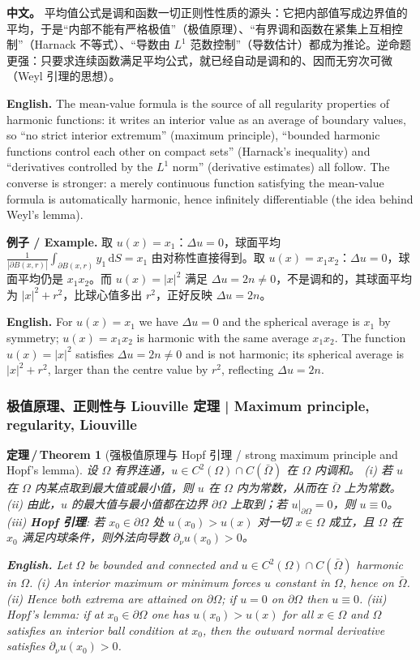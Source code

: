 \documentclass[UTF8,11pt,a4paper]{ctexart}
\newcommand{\APS}[2]{\par\noindent\textbf{中文。} #1\par\noindent\textbf{English.} #2\par\smallskip}
\newcommand{\EN}[1]{\par\noindent \textbf{English.} #1\par}
\newcommand{\EX}[2]{\par\noindent \textbf{例子 / Example.} #1\par\EN{#2}}
\newtheorem{theorem}[definition]{定理\,/\,Theorem}
\newcommand{\dd}{\mathrm{d}}
\begin{document}
\APS{平均值公式是调和函数一切正则性性质的源头：它把内部值写成边界值的平均，于是``内部不能有严格极值''（极值原理）、``有界调和函数在紧集上互相控制''（Harnack 不等式）、``导数由 $L^1$ 范数控制''（导数估计）都成为推论。逆命题更强：只要求连续函数满足平均公式，就已经自动是调和的、因而无穷次可微（Weyl 引理的思想）。}{The mean-value formula is the source of all regularity properties of harmonic functions: it writes an interior value as an average of boundary values, so ``no strict interior extremum'' (maximum principle), ``bounded harmonic functions control each other on compact sets'' (Harnack's inequality) and ``derivatives controlled by the $L^1$ norm'' (derivative estimates) all follow. The converse is stronger: a merely continuous function satisfying the mean-value formula is automatically harmonic, hence infinitely differentiable (the idea behind Weyl's lemma).}

\EX{取 $u(x)=x_1$：$\Delta u=0$，球面平均 $\frac{1}{|\partial B(x,r)|}\int_{\partial B(x,r)}y_1\,\dd S=x_1$ 由对称性直接得到。取 $u(x)=x_1x_2$：$\Delta u=0$，球面平均仍是 $x_1x_2$。而 $u(x)=|x|^2$ 满足 $\Delta u=2n\ne0$，不是调和的，其球面平均为 $|x|^2+r^2$，比球心值多出 $r^2$，正好反映 $\Delta u=2n$。}{For $u(x)=x_1$ we have $\Delta u=0$ and the spherical average is $x_1$ by symmetry; $u(x)=x_1x_2$ is harmonic with the same average $x_1x_2$. The function $u(x)=|x|^2$ satisfies $\Delta u=2n\ne0$ and is not harmonic; its spherical average is $|x|^2+r^2$, larger than the centre value by $r^2$, reflecting $\Delta u=2n$.}

\subsubsection{极值原理、正则性与 Liouville 定理 | Maximum principle, regularity, Liouville}
\begin{theorem}[强极值原理与 Hopf 引理 / strong maximum principle and Hopf's lemma]\label{thm:harmmax}
设 $\Omega$ 有界连通，$u\in C^2(\Omega)\cap C(\bar\Omega)$ 在 $\Omega$ 内调和。
(i) 若 $u$ 在 $\Omega$ 内某点取到最大值或最小值，则 $u$ 在 $\Omega$ 内为常数，从而在 $\bar\Omega$ 上为常数。
(ii) 由此，$u$ 的最大值与最小值都在边界 $\partial\Omega$ 上取到；若 $u|_{\partial\Omega}=0$，则 $u\equiv0$。
(iii) \textbf{Hopf 引理}: 若 $x_0\in\partial\Omega$ 处 $u(x_0)>u(x)$ 对一切 $x\in\Omega$ 成立，且 $\Omega$ 在 $x_0$ 满足内球条件，则外法向导数 $\partial_\nu u(x_0)>0$。
\EN{Let $\Omega$ be bounded and connected and $u\in C^2(\Omega)\cap C(\bar\Omega)$ harmonic in $\Omega$. (i) An interior maximum or minimum forces $u$ constant in $\Omega$, hence on $\bar\Omega$. (ii) Hence both extrema are attained on $\partial\Omega$; if $u=0$ on $\partial\Omega$ then $u\equiv0$. (iii) Hopf's lemma: if at $x_0\in\partial\Omega$ one has $u(x_0)>u(x)$ for all $x\in\Omega$ and $\Omega$ satisfies an interior ball condition at $x_0$, then the outward normal derivative satisfies $\partial_\nu u(x_0)>0$.}
\end{theorem}
\end{document}
